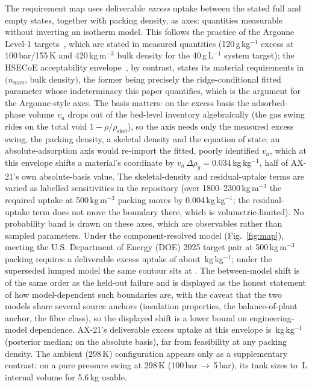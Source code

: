 \documentclass[preprint,12pt]{elsarticle}
\begin{document}
The requirement map uses deliverable \emph{excess} uptake between the
stated full and empty states, together with packing density, as axes:
quantities measurable without inverting an isotherm model. This follows the
practice of the Argonne Level-1 targets~\cite{ahluwalia2015}, which are
stated in measured quantities (120\,g\,kg$^{-1}$ excess at 100\,bar/155\,K
and 420\,kg\,m$^{-3}$ bulk density for the 40\,g\,L$^{-1}$ system target);
the HSECoE acceptability envelope~\cite{hardy2018}, by contrast, states its
material requirements in $(n_{\max}$, bulk density$)$, the former being
precisely the ridge-conditional fitted parameter whose indeterminacy this
paper quantifies, which is the argument for the Argonne-style axes.
The basis matters: on the excess basis the adsorbed-phase volume $v_a$
drops out of the bed-level inventory algebraically (the gas swing rides on
the total void $1-\rho/\rho_{\mathrm{skel}}$), so the axis needs only the
measured excess swing, the packing density, a skeletal density and the
equation of state; an absolute-adsorption axis would re-import the fitted,
poorly identified $v_a$, which at this envelope shifts a material's
coordinate by $v_a\,\Delta\rho_g = 0.034$\,kg\,kg$^{-1}$, half of
AX-21's own absolute-basis value. The skeletal-density and residual-uptake terms are
varied as labelled sensitivities in the repository (over
1800--2300\,kg\,m$^{-3}$ the required uptake at 500\,kg\,m$^{-3}$ packing
moves by 0.004\,kg\,kg$^{-1}$; the residual-uptake term does not move the
boundary there, which is volumetric-limited).
No probability band is drawn on these axes, which are observables rather
than sampled parameters. Under the component-resolved model (Fig.~\ref{fig:map}), meeting the
U.S. Department of Energy (DOE) 2025 target pair at 500\,kg\,m$^{-3}$
packing requires a deliverable excess
uptake of about \vUreqVone\,kg\,kg$^{-1}$; under the superseded lumped
model the same contour sits at \vUreqVzero{}. The between-model shift is
of the same order as the held-out failure and is displayed as the honest
statement of how model-dependent such boundaries are, with the caveat that
the two models share several source anchors (insulation properties, the
balance-of-plant anchor, the fibre class), so the displayed shift is a
lower bound on engineering-model dependence. AX-21's deliverable excess
uptake at this envelope is \vAxUd\,kg\,kg$^{-1}$ (posterior median;
\vAxUdAbs{} on the absolute basis), far from feasibility at any packing
density. The ambient (298\,K) configuration appears only as
a supplementary contrast: on a pure pressure swing at 298\,K
(100\,bar\,$\to$\,5\,bar), its tank sizes to \vAmbientVint\,L internal
volume for 5.6\,kg usable.
\end{document}
